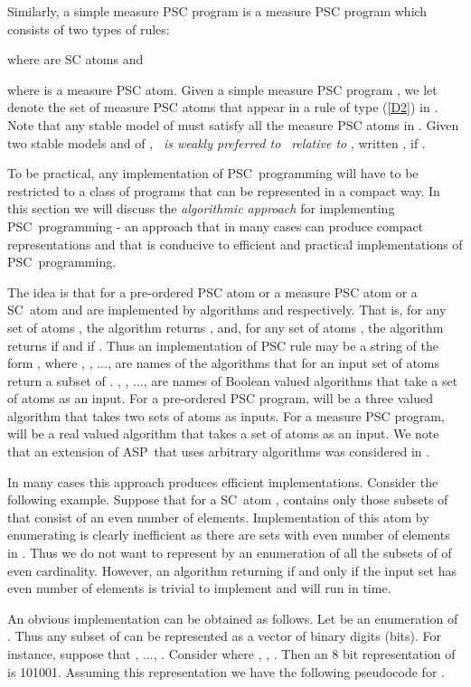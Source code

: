 \documentclass[letterpaper]{article}\usepackage{aaai}
\begin{document}
Similarly, a simple measure PSC program is a measure PSC program  which
consists of two types of rules:

where  are SC atoms and

where  is a measure PSC atom. Given a simple measure PSC program , we
let  denote the set of measure PSC atoms that appear
in a rule of type (\ref{D2}) in . Note that any stable model  of 
must satisfy all the measure PSC atoms in . Given two stable models
 and  of , \emph{\ is weakly preferred to }\emph{\ relative to }, written , if
.

\bigskip

To be practical, any implementation of PSC\ programming will have to be
restricted to a class of programs that can be represented in a compact way. In
this section we will discuss the \emph{algorithmic approach} for implementing
PSC\ programming - an approach that in many cases can produce compact
representations and that is conducive to efficient and practical
implementations of PSC\ programming.

The idea is that for a pre-ordered PSC atom  or a measure PSC atom  or a SC\ atom   and 
are implemented by algorithms  and  respectively. That is, for
any set of atoms , the algorithm  returns , and, for any
set of atoms , the algorithm  returns  if  and  if
. Thus an implementation of PSC rule may be a string of the form
, where , , ...,  are names of the algorithms that for an input set of atoms 
return a subset of . , , ...,  are names of Boolean valued
algorithms that take a set of atoms as an input. For a pre-ordered PSC
program,  will be a three valued algorithm that takes two sets of atoms as
inputs. For a measure PSC program,  will be a real valued algorithm that
takes a set of atoms as an input. We note that an extension of ASP\ that uses
arbitrary algorithms was considered in \cite{HybridASP}.

In many cases this approach produces efficient implementations. Consider the
following example. Suppose that for a SC\ atom ,  contains only those subsets of  that consist of an even number of
elements. Implementation of this atom by enumerating  is clearly
inefficient as there are  sets with even
number of elements in . Thus we do not want to represent  by an
enumeration of all the subsets of  of even cardinality. However, an
algorithm returning  if and only if the input set has even number of
elements is trivial to implement and will run in  time.

An obvious implementation can be obtained as follows. Let  be an enumeration of . Thus any subset of  can be
represented as a vector of  binary digits (bits). For instance, suppose
that , ..., . Consider  where ,
, . Then an 8 bit representation of  is 101001. Assuming
this representation we have the following pseudocode for .
\end{document}
